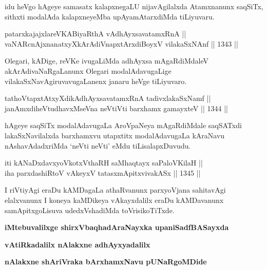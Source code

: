 \begin{artha}
idu heVgo hAgeye samasatx kalapxnegaLU nijavAgilalxda Atamxnanunx saqSiTx, sithxti modalAda kalapxneyeMba upAyamAtarxdiMda tiLiyuvaru.
\end{artha}


\begin{shl}
patarxkajajxlareVKABiyaRthA vA\s dhAyxsavatamxRnA || \\
vaNARcnAjxnanatxyXkArAdiVnapxtArxdiBoyxV vilakaSxNAnf  ||  1343 ||  
\end{shl}

\begin{artha}
Olegari, kADige, reVKe ivugaLiMda adhAyxsa mAgaRdiMdaleV akArAdivaNaRgaLanunx Olegari modalAdavugaLige vilakaSxNavAgiruvavugaLanenx janaru heVge tiLiyuvaro.
\end{artha}

\begin{shl}
tathoVtapxtAtxyXdikAdhAyxsavatamxRnA tadivxlakaSxNamf || \\
janAmxdiheVtudhavxMseVna neVtiVti barxhamx gamayxteV ||  1344 ||  
\end{shl}

\begin{artha}
hAgeye saqSiTx modalAdavugaLa AroVpaNeya mAgaRdiMdale saqSATxdi lakaSxNavilalxda barxhamxvu utapxtitx modalAdavugaLa kAraNavu nAshavAdadxriMda `neVti neVti' eMdu tiLisalapxDuvudu.
\end{artha}


\begin{shl}
iti kANaDxdavxyoVkotxV\s thaRH saMhaqtayx saPaloV\s KilaH || \\
iha parxdashiRtoV vAkeyxV tatasxmApitxvivakASx ||  1345 ||  
\end{shl}

\begin{artha}
I riVtiyAgi eraDu kAMDagaLa athaRvanunx parxyoVjana sahitavAgi elalxvanunx I koneya kaMDikeya vAkayxdalilx eraDu kAMDavanunx samApitxgoLisuva udedxVshadiMda toVrisikoTiTxde.
\end{artha}

\bigskip
\begin{center}
{\bf iMtebuvalilxge shirxVbaqhadAraNayxka upaniSadfBASayxda}

\smallskip
{\bf vAtiRkadalilx nAlakxne adhAyxyadalilx}

\smallskip
{\bf nAlakxne shAriVraka bArxhamxNavu pUNaRgoMDide}
\end{center}
\bigskip

